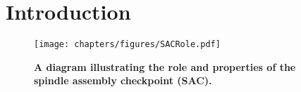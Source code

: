 \chapter{Introduction}
\label{chpt:introduction}




\begin{figure}
    \centering
    \texttt{[image: chapters/figures/SACRole.pdf]}
    \caption{\textbf{A diagram illustrating the role and properties of the spindle assembly checkpoint (SAC).}}
    \label{SACRole}
\end{figure}